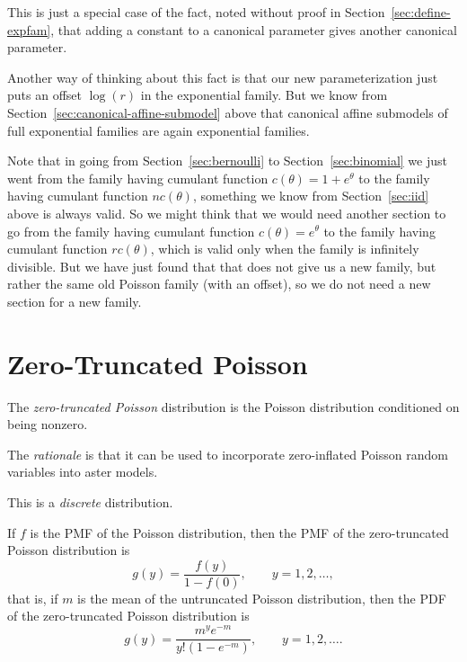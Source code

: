 This is just a special case of the fact,
noted without proof in Section~\ref{sec:define-expfam},
that adding a constant to a canonical parameter gives
another canonical parameter.

Another way of thinking about this fact is that our new parameterization
just puts an offset $\log(r)$ in the exponential family.
But we know from Section~\ref{sec:canonical-affine-submodel} above
that canonical affine submodels of full exponential families are again
exponential families.

Note that in going from Section~\ref{sec:bernoulli}
to Section~\ref{sec:binomial} we just went from the family having cumulant
function $c(\theta) = 1 + e^\theta$ to the family
having cumulant function $n c(\theta)$,
something we know from Section~\ref{sec:iid} above is always valid.
So we might think that we would need another section to go from the
family having cumulant function $c(\theta) = e^\theta$ to the family
having cumulant function $r c(\theta)$, which is valid only when the
family is infinitely divisible.  But we have just found that that does
not give us a new family, but rather the same old Poisson family
(with an offset), so we do not need a new section for a new family.

\section{Zero-Truncated Poisson}
\label{sec:zero-truncated-poisson}

The \emph{zero-truncated Poisson} distribution is the Poisson distribution
conditioned on being nonzero.

The \emph{rationale} is that it can be used to incorporate zero-inflated
Poisson random variables into aster models.

This is a \emph{discrete} distribution.

If $f$ is the PMF of the Poisson distribution, then the PMF of
the zero-truncated Poisson distribution is
\begin{equation} \label{eq:zero-truncated-poisson-pmf-in-terms-of-poisson}
   g(y) = \frac{f(y)}{1 - f(0)}, 
   \qquad y = 1, 2, \ldots,
\end{equation}
that is, if $m$ is the mean of the untruncated Poisson distribution, then
the PDF of the zero-truncated Poisson distribution is
\begin{equation} \label{eq:zero-truncated-poisson-pmf}
   g(y) = \frac{m^y e^{- m}}{y ! (1 - e^{- m})}, 
   \qquad y = 1, 2, \ldots.
\end{equation}

